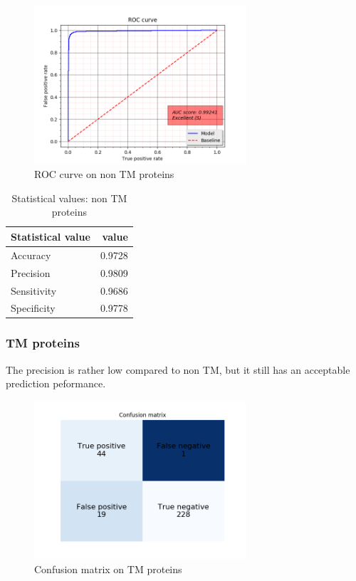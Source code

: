 \begin{figure}[H]
\center
\includegraphics[width=0.7\textwidth]{pictures/non_tm_roc.png}
\caption{\label{fig:non_tm_roc}ROC curve on non TM proteins}
\end{figure}

\begin{table}[H]
\centering
\begin{tabular}{l | r} %
Statistical value & value\\\hline
Accuracy & 0.9728 \\
Precision & 0.9809 \\
Sensitivity & 0.9686 \\
Specificity & 0.9778 \\
\end{tabular}
\caption{\label{tab:non_tm_stat_table}Statistical values: non TM proteins}
\end{table}


\subsubsection{TM proteins}

The precision is rather low compared to non TM, but it still has an acceptable prediction peformance.

\begin{figure}[H]
\center
\includegraphics[width=0.7\textwidth]{pictures/tm_cm.png}
\caption{\label{fig:tm_cm}Confusion matrix on TM proteins}
\end{figure}

